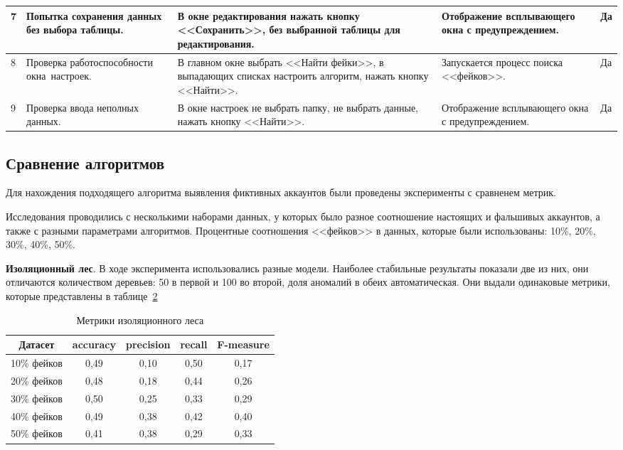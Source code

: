 \begin{table}[H]
\begin{tabular}{|l|p{3cm}|p{5.7cm}|p{2.3cm}|p{2.3cm}|}
    7  & Попытка сохранения данных без выбора таблицы. & В окне редактирования нажать кнопку <<Сохранить>>, без выбранной таблицы для редактирования. & Отображение всплывающего окна с предупреждением. & Да \\ \hline
    8  & Проверка работоспособности окна~настроек. & В главном окне выбрать <<Найти фейки>>, в выпадающих списках настроить алгоритм, нажать кнопку <<Найти>>. & Запускается процесс поиска <<фейков>>. & Да \\ \hline
    9 & Проверка ввода неполных данных. & В окне настроек не выбрать папку, не выбрать данные, нажать кнопку <<Найти>>. & Отображение всплывающего окна с предупреждением. & Да \\ \hline
    \end{tabular}
    \label{table:funcTest}
\end{table}
\vspace{1.5em} 


\subsection{Сравнение алгоритмов}
\label{subsec:experiments}
Для нахождения подходящего алгоритма выявления фиктивных аккаунтов были проведены эксперименты с сравненем метрик. 

Исследования проводились с несколькими наборами данных, у которых было разное соотношение настоящих и фальшивых аккаунтов, а также с разными параметрами алгоритмов. Процентные соотношения <<фейков>> в данных, которые были использованы: 10\%, 20\%, 30\%, 40\%, 50\%.


\textbf{Изоляционный лес}. В ходе эксперимента использовались разные модели. Наиболее стабильные результаты показали две из них, они отличаются количеством деревьев: 50 в первой и 100 во второй, доля аномалий в обеих автоматическая. Они выдали одинаковые метрики, которые представлены в таблице~\ref{tabular:tableIsolationForest1}

\vspace{-0.5em}
\begin{table}[H]
    \caption{Метрики изоляционного леса}
    \vspace{1em}
    \small
    \begin{tabular}{|l|c|c|c|c|}
    \hline
    \multicolumn{1}{|c|}{\textbf{Датасет}} & \textbf{accuracy} & \textbf{precision} & \textbf{recall} & \textbf{F-measure} \\ \hline
    10\% фейков & 0,49 & 0,10 & 0,50 & 0,17 \\ \hline
    20\% фейков & 0,48 & 0,18 & 0,44 & 0,26 \\ \hline
    30\% фейков & 0,50 & 0,25 & 0,33 & 0,29 \\ \hline
    40\% фейков & 0,49 & 0,38 & 0,42 & 0,40 \\ \hline
    50\% фейков & 0,41 & 0,38 & 0,29 & 0,33 \\ \hline
    \end{tabular}
    \label{tabular:tableIsolationForest1}
\end{table}


